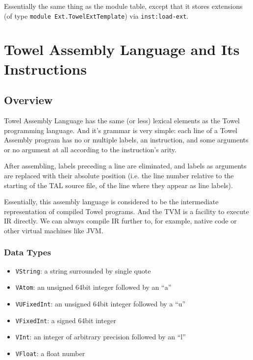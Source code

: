 \documentclass{report}
\newcommand{\mtilde}[1]{\textasciitilde}
\newcommand{\marg}[1]{\texttt{\mtilde ~#1}}
\newcommand{\inst}[1] {\texttt{inst:#1}}
\begin{document}
Essentially the same thing as the module table, except that it stores extensions (of type \texttt{module Ext.TowelExtTemplate}) via \inst{load-ext}.

\renewcommand{\marg}[1]{\texttt{IARG\_#1}}
\newcommand{\sarg}[1]{\texttt{SARG\_#1}}
\newcommand{\parg}[1]{\texttt{PARG\_#1}}

\chapter{Towel Assembly Language and Its Instructions}

\section{Overview}

Towel Assembly Language has the same (or less) lexical elements as the Towel programming language. And it's grammar is very simple: each line of a Towel Assembly program has no or multiple labels, an instruction, and some arguments or no argument at all according to the instruction's arity.

After assembling, labels preceding a line are eliminated, and labels as arguments are replaced with their absolute position (i.e. the line number relative to the starting of the TAL source file, of the line where they appear as line labels).

Essentially, this assembly language is considered to be the intermediate representation of compiled Towel programs. And the TVM is a facility to execute IR directly. We can always compile IR further to, for example, native code or other virtual machines like JVM.

\subsection{Data Types}

\begin{itemize}
\item \texttt{VString}: a string surrounded by single quote
\item \texttt{VAtom}: an unsigned 64bit integer followed by an ``a''
\item \texttt{VUFixedInt}: an unsigned 64bit integer followed by a ``u''
\item \texttt{VFixedInt}: a signed 64bit integer
\item \texttt{VInt}: an integer of arbitrary precision followed by an ``l''
\item \texttt{VFloat}: a float number
\end{itemize}
\end{document}

